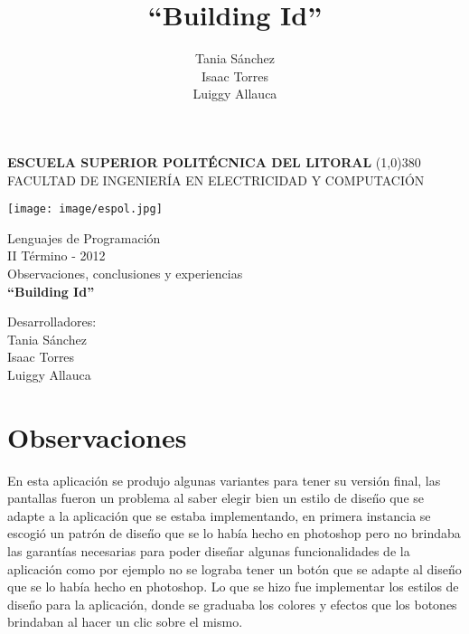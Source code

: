 \documentclass[a4paper,11pt]{article}
\title{``Building Id''}
\author{Tania S\'{a}nchez\\  Isaac Torres  \\Luiggy Allauca}
\begin{document}
\setlength{\topmargin}{0.5in}
			\pagestyle{empty}
			\begin{center}
				\textbf{
					\vspace{-0.7em}
					ESCUELA SUPERIOR POLIT\'{E}CNICA DEL LITORAL
				}
				\line(1,0){380}\\		
				\scriptsize{FACULTAD DE INGENIER\'{I}A EN ELECTRICIDAD Y COMPUTACI\'{O}N}
				
				\vspace{2.5em}
				\texttt{[image: image/espol.jpg]} 
			\end{center}
			
			\begin{center}
				\vspace{2.5em}
				Lenguajes de Programaci\'{o}n
				\\II T\'{e}rmino - 2012
				\vspace{1.5em}  %
				\\Observaciones, conclusiones y experiencias \\
				\vspace{5em}
				\Huge{\textbf{``Building Id''	\vspace{3em}}}
			\end{center}	
			
			


				\hspace*{5cm}Desarrolladores:
				\vspace{1.5em}
				\\\hspace*{8cm}Tania S\'{a}nchez
				\\\hspace*{8cm}Isaac Torres
				\\\hspace*{8cm}Luiggy Allauca


\newpage 

\setlength{\topmargin}{-0,2in}
\tableofcontents

\newpage 


\section{Observaciones}
En esta aplicaci\'{o}n se produjo algunas variantes para tener su versi\'{o}n final, las pantallas fueron un problema al saber elegir bien un estilo de dise\H{n}o que se adapte a la aplicaci\'{o}n que se estaba implementando, en primera instancia se escogi\'{o} un patr\'{o}n de dise\H{n}o que se lo hab\'{i}a hecho en photoshop pero no brindaba las garant\'{i}as necesarias para poder dise\H{n}ar algunas funcionalidades de la aplicaci\'{o}n como por ejemplo no se lograba tener un bot\'{o}n que se adapte al dise\H{n}o que se lo hab\'{i}a hecho en photoshop. Lo que se hizo fue implementar los estilos de dise\H{n}o para la aplicaci\'{o}n, donde se graduaba los colores y efectos que los botones brindaban al hacer un clic sobre el mismo.
\end{document}
